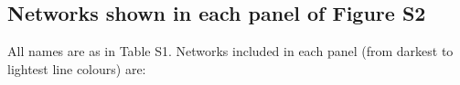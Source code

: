 \documentclass[12pt]{article}
\begin{document}
\begin{spacing}{1.5}
\begin{figure}[!h]
{         %
         }
        \label{within_family_regression}
      \end{figure}


    \subsection*{Networks shown in each panel of Figure S2}

    All names are as in Table S1. Networks included in each panel (from darkest to lightest line colours) are:



\end{spacing}
\end{document}
